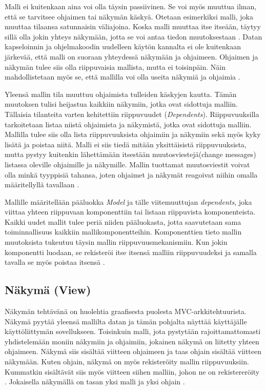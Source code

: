 \documentclass[finnish,utf8,nonumbib,palatino,kandi]{gradu2}
\begin{document}
Malli ei kuitenkaan aina voi olla täysin passiivinen. Se voi myös muuttua ilman, että se tarvitsee ohjaimen tai näkymän käskyä. Otetaan esimerkiksi malli, joka muuttaa tilaansa satunnaisin väliajoina. Koska malli muuttaa itse itseään, täytyy sillä olla jokin yhteys näkymään, jotta se voi antaa tiedon muutoksestaan \cite{Burbeck}. Datan kapseloinnin ja ohjelmakoodin uudelleen käytön kannalta ei ole kuitenkaan järkevää, että malli on suoraan yhteydessä näkymään ja ohjaimeen. Ohjaimen ja näkymän tulee siis olla riippuvaisia mallista, mutta ei toisinpäin. Näin mahdollistetaan myös se, että mallilla voi olla useita näkymiä ja ohjaimia \cite[s. 4]{Krasner:desc}.

Yleensä mallin tila muuttuu ohjaimista tulleiden käskyjen kautta. Tämän muutoksen tulisi heijastua kaikkiin näkymiin, jotka ovat sidottuja malliin. Tällaisia tilanteita varten kehitettiin riippuvuudet (\emph{Dependents}).
Riippuvuuksilla tarkoitetaan listaa niistä ohjaimista ja näkymistä, jotka ovat sidottuja malliin. Mallilla tulee siis olla lista riippuvuuksista ohjaimiin ja näkymiin sekä myös kyky lisätä ja poistaa niitä. Malli ei siis tiedä mitään yksittäisistä riippuvuuksista, mutta pystyy kuitenkin lähettämään itsestään muutosviestejä(change messages) listassa oleville ohjaimille ja näkymille. Mallin tuottamat muutosviestit voivat olla minkä tyyppisiä tahansa, joten ohjaimet ja näkymät reagoivat niihin omalla määritellyllä tavallaan  \cite[s.2-3]{Krasner}.

Mallille määritellään pääluokka \emph{Model} ja tälle viitemuuttujan \emph{dependents}, joka viittaa yhteen riippuvaan komponenttiin tai listaan riippuvista komponenteista. Kaikki uudet mallit tulee periä niiden pääluokasta, jotta saavutetaan sama toiminnallisuus kaikkiin mallikomponentteihin. Komponenttien tieto mallin muutoksista tukeutuu täysin mallin riippuvuusmekanismiin. Kun jokin komponentti luodaan, se rekisteröi itse itsensä malliin riippuvuudeksi ja samalla tavalla se myös poistaa itsensä \cite{Burbeck}.

\subsection{Näkymä (View)}
Näkymän tehtävänä on huolehtia graafisesta puolesta MVC-arkkitehtuurista. Näkymä pyytää yleensä mallilta datan ja tämän pohjalta näyttää käyttäjälle käyttöliittymän sovellukseen. Toisinkuin malli, jota pystytään rajoittamattomasti yhdistelemään moniin näkymiin ja ohjaimiin, jokainen näkymä on liitetty yhteen ohjaimeen.  Näkymä siis sisältää viitteen ohjaimeen ja taas ohjain sisältää viitteen näkymään. Kuten ohjain, näkymä on myös rekisteröity mallin riippuvuuksiin. Kummatkin sisältävät siis myös viitteen siihen malliin, johon ne on rekistereröity \cite{Burbeck}. Jokaisella näkymällä on tasan yksi malli ja yksi ohjain \cite[s. 7]{Krasner:desc}. 
\end{document}
